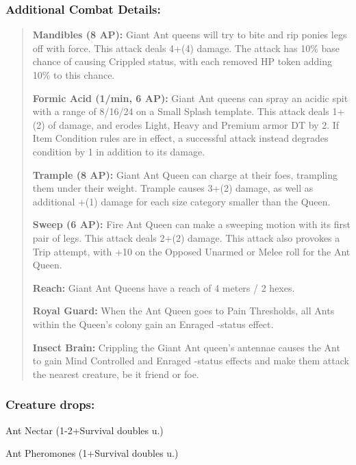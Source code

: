 \documentclass[11pt,a4paper,twocolumn]{book}
\begin{document}
	\subsubsection*{Additional Combat Details:}
	\begin{verse}
		\textbf{Mandibles (8 AP):} Giant Ant queens will try to bite and rip ponies legs off with force. This attack deals 4+(4) damage. The attack has 10\% base chance of causing Crippled status, with each removed HP token adding 10\% to this chance.
		
		\textbf{Formic Acid (1/min, 6 AP):} Giant Ant queens can spray an acidic spit with a range of 8/16/24 on a Small Splash template. This attack deals 1+(2) of damage, and erodes Light, Heavy and Premium armor DT by 2. If Item Condition rules are in effect, a successful attack instead degrades condition by 1 in addition to its damage.
		
		\textbf{Trample (8 AP):} Giant Ant Queen can charge at their foes, trampling them under their weight. Trample causes 3+(2) damage, as well as additional +(1) damage for each size category smaller than the Queen.
		
		\textbf{Sweep (6 AP):} Fire Ant Queen can make a sweeping motion with its first pair of legs. This attack deals 2+(2) damage. This attack also provokes a Trip attempt, with +10 on the Opposed Unarmed or Melee roll for the Ant Queen.
		
		\textbf{Reach:} Giant Ant Queens have a reach of 4 meters / 2 hexes.
		
		\textbf{Royal Guard:} When the Ant Queen goes to Pain Thresholds, all Ants within the Queen's colony gain an Enraged -status effect.
		
		\textbf{Insect Brain:} Crippling the Giant Ant queen's antennae causes the Ant to gain Mind Controlled and Enraged -status effects and make them attack the nearest creature, be it friend or foe.
		
	\end{verse}
	
	\subsubsection*{Creature drops:}
	\begin{compactitem}
		\item Ant Nectar (1-2+Survival doubles u.)
		\item Ant Pheromones (1+Survival doubles u.)
	\end{compactitem}
	
\end{document}
